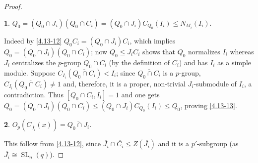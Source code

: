 \documentclass{amsart}
\numberwithin{equation}{section}
\theoremstyle{definition}
\theoremstyle{subresult}
\newtheorem{subresult}{}[equation]
\theoremstyle{caseresult}
\newcommand{\SL}{\operatorname{SL}}
\newcommand{\ov}{\overline}
\newcommand{\<}{\langle}
\renewcommand{\>}{\rangle}
\begin{document}
\begin{proof}
	\begin{subresult}\label{4.13-13}
		$Q_0 = (Q_0 \cap J_i)(Q_0 \cap C_i) = (Q_0 \cap J_i)C_{Q_0}(I_i) \le N_{M_i}(I_i).$
	\end{subresult}
	Indeed by \eqref{4.13-12} $Q_0C_i =(Q_0 \cap J_i)C_i$, which implies $Q_0 = (Q_0  \cap J_i)(Q_0 \cap C_i)$; now $Q_0 \le J_iC_i$ shows that $Q_0$ normalizes $I_i$ whereas $J_i$ centralizes the $p$-group $\ov{Q_0 \cap C_i}$ (by the definition of $C_i$) and has $I_i$ as a simple module. Suppose $C_{I_i}(\ov{Q_0 \cap C_i}) < I_i$; since $\ov{Q_0 \cap C_i}$ is a $p$-group, $C_{I_i}(\ov{Q_0 \cap C_i}) \ne 1$ and, therefore, it is a proper, non-trivial $J_i$-submodule of $I_i$, a contradiction. Thus $[Q_0 \cap C_i,I_i] =1$ and one gets $Q_0 = (Q_0 \cap J_i)(Q_0 \cap C_i) \le (Q_0 \cap J_i)C_{Q_0}(I_i) \le Q_0$, proving \eqref{4.13-13}.\\
	
	\begin{subresult}\label{4.13-14}
		$O_p(C_{\ov{J_i}}(x)) = \ov{Q_0 \cap J_i}$.
	\end{subresult}
	This follow from \eqref{4.13-12}, since $\ov{J_i}\cap \ov{C_i} \le Z(\ov{J_i})$ and it is a $p'$-subgroup (as $\ov{J_i} \cong \SL_n(q)$).
	

\end{proof}
\end{document}

